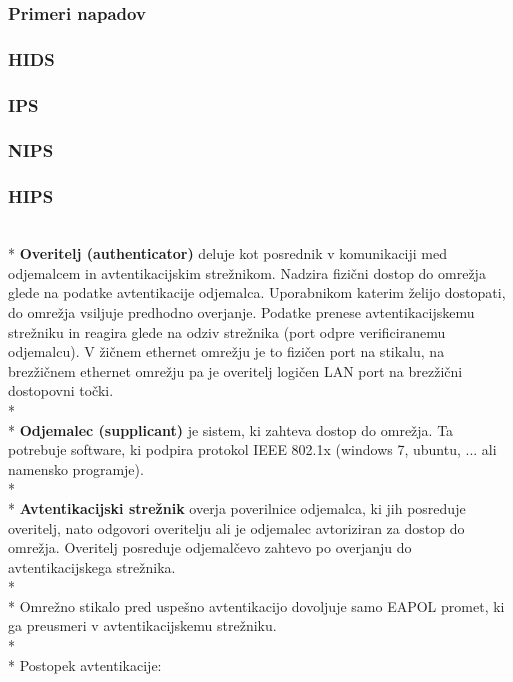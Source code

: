 \documentclass[12pt]{article}
\begin{document}
\subsubsection{Primeri napadov}


\subsubsection{HIDS}

\subsubsection{IPS}
\subsubsection{NIPS}
\subsubsection{HIPS}

\\* \indent
\textbf{Overitelj (authenticator)} deluje kot posrednik v komunikaciji med odjemalcem in avtentikacijskim strežnikom. Nadzira fizični dostop do omrežja glede na podatke avtentikacije odjemalca. Uporabnikom katerim želijo dostopati, do omrežja vsiljuje predhodno overjanje. Podatke prenese avtentikacijskemu strežniku in reagira glede na odziv strežnika (port odpre verificiranemu odjemalcu). V žičnem ethernet omrežju je to fizičen port na stikalu, na brezžičnem ethernet omrežju pa je overitelj logičen LAN port na brezžični dostopovni točki.
\\*
\\* \indent
\textbf{Odjemalec (supplicant)} je sistem, ki zahteva dostop do omrežja. Ta potrebuje software, ki podpira protokol IEEE 802.1x (windows 7, ubuntu, ... ali namensko programje).
\\*
\\* \indent
\textbf{Avtentikacijski strežnik} overja poverilnice odjemalca, ki jih posreduje overitelj, nato odgovori overitelju ali je odjemalec avtoriziran za dostop do omrežja. Overitelj posreduje odjemalčevo zahtevo po overjanju do avtentikacijskega strežnika.
\\*
\\* \indent
Omrežno stikalo pred uspešno avtentikacijo dovoljuje samo EAPOL promet, ki ga preusmeri v avtentikacijskemu strežniku.
\\*
\\*
Postopek avtentikacije:
\end{document}
